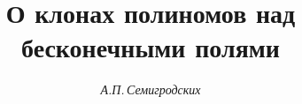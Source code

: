 




% 





\newcommand{\Close}[1]{{\langle {#1}\rangle}}


\newcommand{\Class}[1]{{\Close{\!\Close{#1}\!}}}


\newcommand{\Sub}{\bold{Sub}}


\newcommand{\tts}[1]{}









\setcounter{page}{53}















\author{\it А.П.\,Семигродских}




\title{О клонах полиномов над бесконечными полями}





\date{}




\pagestyle{plain} %







\maketitle


